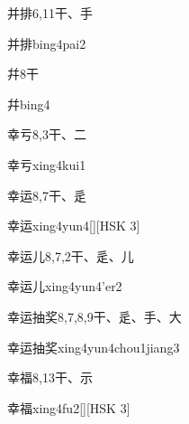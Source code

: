 \begin{entry}{并排}{6,11}{⼲、⼿}
  \begin{phonetics}{并排}{bing4pai2}
  \end{phonetics}
\end{entry}

\begin{entry}{幷}{8}{⼲}
  \begin{phonetics}{幷}{bing4}
  \end{phonetics}
\end{entry}

\begin{entry}{幸亏}{8,3}{⼲、⼆}
  \begin{phonetics}{幸亏}{xing4kui1}
  \end{phonetics}
\end{entry}

\begin{entry}{幸运}{8,7}{⼲、⾡}
  \begin{phonetics}{幸运}{xing4yun4}[][HSK 3]
  \end{phonetics}
\end{entry}

\begin{entry}{幸运儿}{8,7,2}{⼲、⾡、⼉}
  \begin{phonetics}{幸运儿}{xing4yun4'er2}
  \end{phonetics}
\end{entry}

\begin{entry}{幸运抽奖}{8,7,8,9}{⼲、⾡、⼿、⼤}
  \begin{phonetics}{幸运抽奖}{xing4yun4chou1jiang3}
  \end{phonetics}
\end{entry}

\begin{entry}{幸福}{8,13}{⼲、⽰}
  \begin{phonetics}{幸福}{xing4fu2}[][HSK 3]
  \end{phonetics}
\end{entry}


